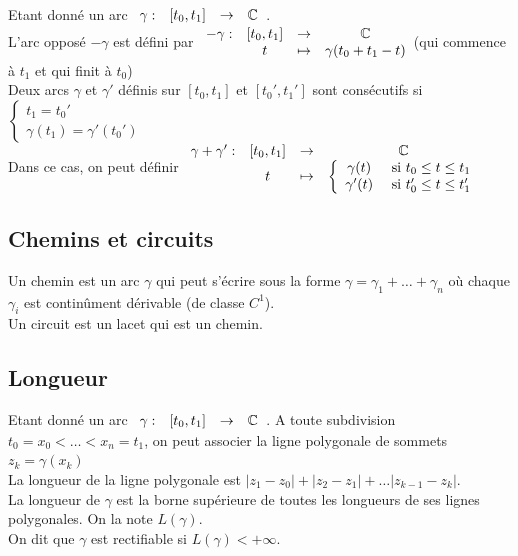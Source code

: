 \documentclass[]{report}
\begin{document}
\begin{df}{}{}
    Etant donné un arc $\begin{array}{ccccc}
\gamma : & [t_0,t_1] & \to & \mathbb{C}
\end{array}$. \\L'arc opposé $-\gamma$ est défini par $\begin{array}{ccccc}
-\gamma : & [t_0,t_1] & \to & \mathbb{C} \\
  & t & \mapsto & \gamma(t_0+t_1-t)
\end{array}$(qui commence à $t_1$ et qui finit à $t_0$)\\
Deux arcs $\gamma$ et $\gamma'$ définis sur $[t_0,t_1]$ et $[t_0',t_1']$ sont consécutifs si $\left\{\begin{array}{cc}
t_1=t_0'\\
\gamma(t_1)=\gamma'(t_0')
\end{array}\right.$\\
Dans ce cas, on peut définir $\begin{array}{ccccc}
\gamma+\gamma' : & [t_0,t_1] & \to & \mathbb{C} \\
& t & \mapsto & \left\{\begin{array}{cc}
\gamma(t)     & \text{ si } t_0 \le t \le t_1 \\
\gamma'(t)     & \text{ si } t_0' \le t \le t_1'
\end{array}\right.
\end{array}$
\end{df}

\subsection{Chemins et circuits}

Un chemin est un arc $\gamma$ qui peut s'écrire sous la forme $\gamma=\gamma_1+\dots+\gamma_n$ où chaque $\gamma_i$ est continûment dérivable (de classe $C^1$).\\
Un circuit est un lacet qui est un chemin.

\subsection{Longueur}

    Etant donné un arc $\begin{array}{ccccc}
\gamma : & [t_0,t_1] & \to & \mathbb{C}
\end{array}$. A toute subdivision $t_0=x_0<\dots<x_n=t_1$, on peut associer la ligne polygonale de sommets $z_k=\gamma(x_k)$\\
La longueur de la ligne polygonale est $|z_1-z_0|+|z_2-z_1|+\dots|z_{k-1}-z_k|$.\\
La longueur de $\gamma$ est la borne supérieure de toutes les longueurs de ses lignes polygonales. On la note $L(\gamma)$.\\
On dit que $\gamma$ est rectifiable si $L(\gamma)<+\infty$.
\end{document}
